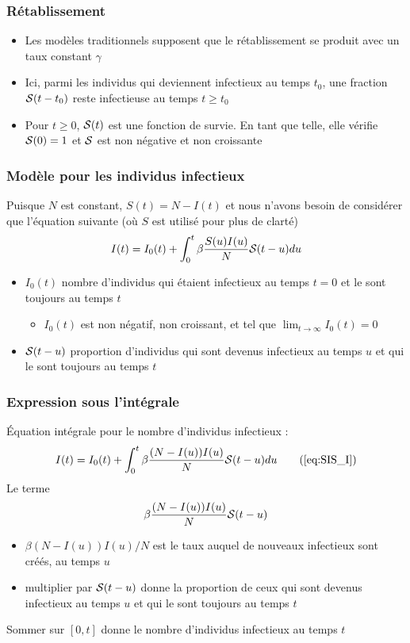 \documentclass[aspectratio=169]{beamer}\usepackage[]{graphicx}\usepackage[]{xcolor}
\begin{document}
\begin{frame}\frametitle{Rétablissement}
\begin{itemize}
\item Les modèles traditionnels supposent que le rétablissement se produit avec un taux constant
$\gamma$
\vfill
\item Ici, parmi les individus qui deviennent
infectieux au temps $t_0$, une fraction $\S(t-t_0)$ reste infectieuse au
temps $t\geq t_0$
\vfill
\item \imply\;
Pour $t\geq 0$, $\S(t)$ est une fonction de survie. En tant que telle, elle vérifie
$\S(0)=1$ et $\S$ est non négative et non croissante
\end{itemize}
\end{frame}


\begin{frame}\frametitle{Modèle pour les individus infectieux}
Puisque $N$ est constant, $S(t)=N-I(t)$ et nous n'avons besoin de
considérer que l'équation suivante (où $S$ est utilisé pour plus de clarté)
\begin{equation}
I(t) = I_0(t)+ \int_0^t\beta\frac{S(u)I(u)}{N} \S(t-u) du
\label{eq:SIS_I} 
\end{equation}
\vfill
\begin{itemize}
\item $I_0(t)$ nombre d'individus qui étaient infectieux au temps
$t=0$ et le sont toujours au temps $t$
\begin{itemize}
\item $I_0(t)$ est non négatif, non croissant, et
tel que $\lim_{t\to\infty}I_0(t)=0$
\end{itemize}
\item $\S(t-u)$ proportion d'individus qui sont devenus infectieux au temps $u$ et qui le sont toujours au temps $t$
\end{itemize}
\end{frame}


\begin{frame}\frametitle{Expression sous l'intégrale}
Équation intégrale pour le nombre d'individus infectieux : 
\begin{equation}
I(t) = I_0(t)+ \int_0^t\beta\frac{(N-I(u))I(u)}{N} \S(t-u) du
\tag{\ref{eq:SIS_I}} 
\end{equation}
Le terme
\[
\beta\frac{(N-I(u))I(u)}{N} \S(t-u)
\]
\begin{itemize}
\item $\beta (N-I(u))I(u)/N$ est le taux auquel de nouveaux infectieux sont créés, au temps $u$
\item multiplier par $\S(t-u)$ donne la proportion de ceux qui sont devenus
infectieux au temps $u$ et qui le sont toujours au temps $t$
\end{itemize}
Sommer sur $[0,t]$ donne le nombre d'individus infectieux au temps $t$
\end{frame}
\end{document}
